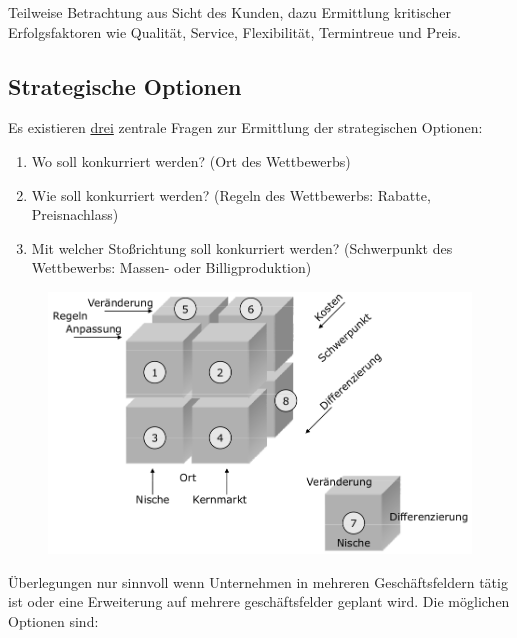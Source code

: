 \documentclass[a4paper,11pt, twoside]{article}
\newcommand\mpar[1]{\marginpar {\flushleft\small #1}}
\begin{document}
Teilweise Betrachtung aus Sicht des Kunden, dazu Ermittlung kritischer Erfolgsfaktoren wie Qualität, Service, Flexibilität, Termintreue und Preis.

\subsection{Strategische Optionen}

\mpar{\textcolor{red}{Nischenmarkt: schwierig, falls besetzt}}
Es existieren \underline{drei} zentrale Fragen zur Ermittlung der strategischen Optionen:
\begin{enumerate}
	\item Wo soll konkurriert werden? (Ort des Wettbewerbs)
	\item Wie soll konkurriert werden? (Regeln des Wettbewerbs: Rabatte, Preisnachlass)
	\item Mit welcher Stoßrichtung soll konkurriert werden? (Schwerpunkt des Wettbewerbs: Massen- oder Billigproduktion)
\end{enumerate}

\begin{figure}[h]
 \begin{center}
   \includegraphics[scale=0.3]{bilder/strategische_optionen.png}
 \end{center}
\end{figure}

Überlegungen nur sinnvoll wenn Unternehmen in mehreren Geschäftsfeldern tätig ist oder eine Erweiterung auf mehrere geschäftsfelder geplant wird. 
Die möglichen Optionen sind:
\end{document}
